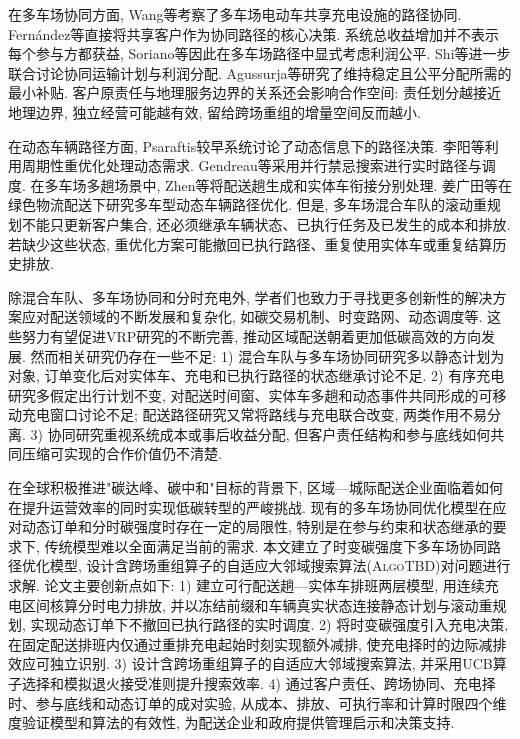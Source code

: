 \documentclass{setp-new}
\begin{document}
在多车场协同方面, Wang等\cite{ref:7}考察了多车场电动车共享充电设施的路径协同.
Fern\'{a}ndez等\cite{ref:49}直接将共享客户作为协同路径的核心决策.
系统总收益增加并不表示每个参与方都获益,
Soriano等\cite{ref:8}因此在多车场路径中显式考虑利润公平.
Shi等\cite{ref:9}进一步联合讨论协同运输计划与利润分配.
Agussurja等\cite{ref:10}研究了维持稳定且公平分配所需的最小补贴.
客户原责任与地理服务边界的关系还会影响合作空间:
责任划分越接近地理边界, 独立经营可能越有效,
留给跨场重组的增量空间反而越小.

在动态车辆路径方面, Psaraftis\cite{ref:14}较早系统讨论了动态信息下的路径决策.
李阳等\cite{ref:18}利用周期性重优化处理动态需求.
Gendreau等\cite{ref:22}采用并行禁忌搜索进行实时路径与调度.
在多车场多趟场景中, Zhen等\cite{ref:44}将配送趟生成和实体车衔接分别处理.
姜广田等\cite{ref:51}在绿色物流配送下研究多车型动态车辆路径优化.
但是, 多车场混合车队的滚动重规划不能只更新客户集合,
还必须继承车辆状态、已执行任务及已发生的成本和排放.
若缺少这些状态, 重优化方案可能撤回已执行路径、重复使用实体车或重复结算历史排放.

除混合车队、多车场协同和分时充电外,
学者们也致力于寻找更多创新性的解决方案应对配送领域的不断发展和复杂化,
如碳交易机制、时变路网、动态调度等.
这些努力有望促进VRP研究的不断完善, 推动区域配送朝着更加低碳高效的方向发展.
然而相关研究仍存在一些不足:
1) 混合车队与多车场协同研究多以静态计划为对象,
订单变化后对实体车、充电和已执行路径的状态继承讨论不足.
2) 有序充电研究多假定出行计划不变,
对配送时间窗、实体车多趟和动态事件共同形成的可移动充电窗口讨论不足;
配送路径研究又常将路线与充电联合改变, 两类作用不易分离.
3) 协同研究重视系统成本或事后收益分配,
但客户责任结构和参与底线如何共同压缩可实现的合作价值仍不清楚.

在全球积极推进"碳达峰、碳中和"目标的背景下,
区域—城际配送企业面临着如何在提升运营效率的同时实现低碳转型的严峻挑战.
现有的多车场协同优化模型在应对动态订单和分时碳强度时存在一定的局限性,
特别是在参与约束和状态继承的要求下, 传统模型难以全面满足当前的需求.
本文建立了时变碳强度下多车场协同路径优化模型,
设计含跨场重组算子的自适应大邻域搜索算法(\textsc{AlgoTBD})对问题进行求解.
论文主要创新点如下:
1) 建立可行配送趟—实体车排班两层模型,
用连续充电区间核算分时电力排放, 并以冻结前缀和车辆真实状态连接静态计划与滚动重规划,
实现动态订单下不撤回已执行路径的实时调度.
2) 将时变碳强度引入充电决策,
在固定配送排班内仅通过重排充电起始时刻实现额外减排,
使充电择时的边际减排效应可独立识别.
3) 设计含跨场重组算子的自适应大邻域搜索算法,
并采用UCB算子选择和模拟退火接受准则提升搜索效率.
4) 通过客户责任、跨场协同、充电择时、参与底线和动态订单的成对实验,
从成本、排放、可执行率和计算时限四个维度验证模型和算法的有效性,
为配送企业和政府提供管理启示和决策支持.
\end{document}
